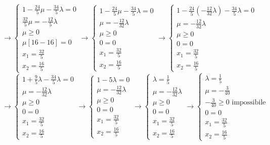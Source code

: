 \documentclass[a4paper,12pt, oneside]{book}
\begin{document}
\[\to
  \begin{cases}
    1-\frac{24}{5}\mu-\frac{34}{5}\lambda=0\\
    \frac{32}{5}\mu=-\frac{12}{5}\lambda\\
    \mu\geq 0\\
    \mu[16-16]=0\\
    x_1=\frac{32}{5} \\
    x_2=\frac{16}{5}
  \end{cases}\to
  \begin{cases}
    1-\frac{24}{5}\mu-\frac{34}{5}\lambda=0\\
    \mu=-\frac{12}{32}\lambda\\
    \mu\geq 0\\
    0=0\\
    x_1=\frac{32}{5} \\
    x_2=\frac{16}{5}
  \end{cases}\to
  \begin{cases}
    1-\frac{24}{5}\left(-\frac{12}{32}\lambda\right)-\frac{34}{5}\lambda=0\\
    \mu=-\frac{12}{32}\lambda\\
    \mu\geq 0\\
    0=0\\
    x_1=\frac{32}{5} \\
    x_2=\frac{16}{5}
  \end{cases}
\]
\[\to
  \begin{cases}
    1+\frac{9}{5}\lambda-\frac{34}{5}\lambda=0\\
    \mu=-\frac{12}{32}\lambda\\
    \mu\geq 0\\
    0=0\\
    x_1=\frac{32}{5} \\
    x_2=\frac{16}{5}
  \end{cases}\to
  \begin{cases}
    1-5\lambda=0\\
    \mu=-\frac{12}{32}\lambda\\
    \mu\geq 0\\
    0=0\\
    x_1=\frac{32}{5} \\
    x_2=\frac{16}{5}
  \end{cases}\to
  \begin{cases}
    \lambda=\frac{1}{5}\\
    \mu=-\frac{12}{32}\lambda\\
    \mu\geq 0\\
    0=0\\
    x_1=\frac{32}{5} \\
    x_2=\frac{16}{5}
  \end{cases}\to
  \begin{cases}
    \lambda=\frac{1}{5}\\
    \mu=-\frac{3}{40}\\
    -\frac{3}{40}\geq 0 \mbox{ impossibile}\\
    0=0\\
    x_1=\frac{32}{5} \\
    x_2=\frac{16}{5}
  \end{cases}
\]
\end{document}

